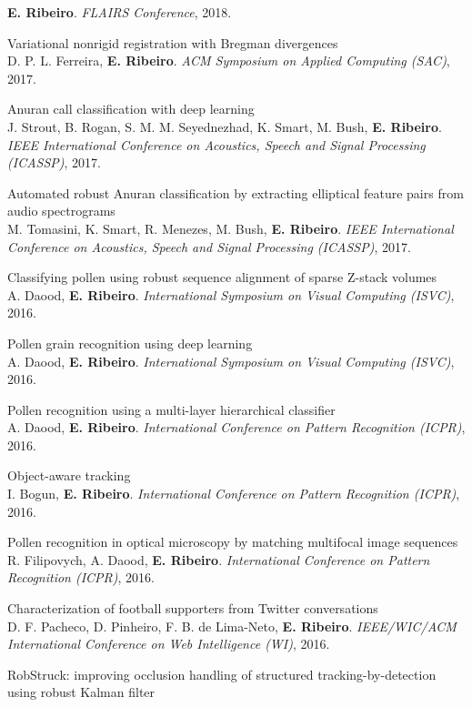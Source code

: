 \documentclass[11pt]{article}
\begin{document}
\begin{cvitems}
  \textbf{E. Ribeiro}. \textit{FLAIRS Conference}, 2018.
  \item Variational nonrigid registration with Bregman divergences\\
  D. P. L. Ferreira, \textbf{E. Ribeiro}. \textit{ACM Symposium on Applied Computing (SAC)}, 2017.
  \item Anuran call classification with deep learning\\
  J. Strout, B. Rogan, S. M. M. Seyednezhad, K. Smart, M. Bush, \textbf{E. Ribeiro}. \textit{IEEE International Conference on Acoustics, Speech and Signal Processing (ICASSP)}, 2017.
  \item Automated robust Anuran classification by extracting elliptical feature pairs from audio spectrograms\\
  M. Tomasini, K. Smart, R. Menezes, M. Bush, \textbf{E. Ribeiro}. \textit{IEEE International Conference on Acoustics, Speech and Signal Processing (ICASSP)}, 2017.
  \item Classifying pollen using robust sequence alignment of sparse Z-stack volumes\\
  A. Daood, \textbf{E. Ribeiro}. \textit{International Symposium on Visual Computing (ISVC)}, 2016.
  \item Pollen grain recognition using deep learning\\
  A. Daood, \textbf{E. Ribeiro}. \textit{International Symposium on Visual Computing (ISVC)}, 2016.
  \item Pollen recognition using a multi-layer hierarchical classifier\\
  A. Daood, \textbf{E. Ribeiro}. \textit{International Conference on Pattern Recognition (ICPR)}, 2016.
  \item Object-aware tracking\\
  I. Bogun, \textbf{E. Ribeiro}. \textit{International Conference on Pattern Recognition (ICPR)}, 2016.
  \item Pollen recognition in optical microscopy by matching multifocal image sequences\\
  R. Filipovych, A. Daood, \textbf{E. Ribeiro}. \textit{International Conference on Pattern Recognition (ICPR)}, 2016.
  \item Characterization of football supporters from Twitter conversations\\
  D. F. Pacheco, D. Pinheiro, F. B. de Lima-Neto, \textbf{E. Ribeiro}. \textit{IEEE/WIC/ACM International Conference on Web Intelligence (WI)}, 2016.
  \item RobStruck: improving occlusion handling of structured tracking-by-detection using robust Kalman filter\\

\end{cvitems}
\end{document}
